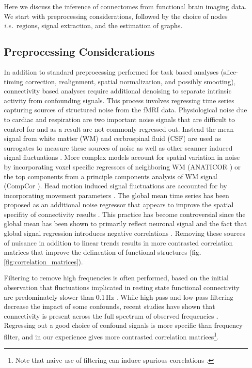 \documentclass[5p]{elsarticle}
\begin{document}
Here we discuss the inference of connectomes from functional brain
imaging data. We start with preprocessing considerations, followed by
the choice of nodes \emph{i.e.}\ regions,
signal extraction, and the estimation of graphs.  

\subsection{Preprocessing Considerations}

In addition to standard preprocessing performed for task based analyses
(slice-timing correction, realignment, spatial normalization, and possibly
smooting), connectivity based analyses require additional denoising 
to separate intrinsic activity from confounding signals. This process involves
regressing time series capturing sources of structured noise from the fMRI data.
Physiological noise due to cardiac and respiration are two important
noise signals \cite{Hu1993, lund2006, birn2006, birn2008} that are
difficult to control for and as a result are not commonly regressed out. Instead
the mean signal from white matter (WM) and cerbrospinal fluid (CSF) are used as
surrogates to measure these sources of noise as well as other scanner induced
signal fluctuations \cite{fox2005, lund2006}. More complex models account for
spatial variation in noise by incorporating voxel specific regressors of
neighboring WM (ANATICOR \cite{jo2010}) or the top components from a principle
components analysis of WM signal (CompCor \cite{behzadi2007}). Head motion
induced signal fluctuations are accounted for by incorporating movement
parameters \cite{friston1996, fox2005, lund2006}. The global mean time series
has been proposed as an additional noise regressor that appears to improve the
spatial specifity of connectivity results \cite{fox2005, fox2009}. This practice
has become controversial since the global mean has been shown to primarily reflect neuronal
signal and the fact that global signal regression introduces negative correlations
\cite{murphy2009,chang2009,saad2012}. 
Removing these sources of
nuisance in addition to linear trends results in more contrasted
correlation matrices that improve the delineation of functional structures
(fig.\,\ref{fig:correlation_matrices}). 

Filtering to remove high frequencies is often performed, based on the initial
observation that fluctuations implicated in resting state functional
connectivity are predominately slower than 0.1\,Hz \cite{cordes2001,biswal1995}.
While high-pass and low-pass filtering decrease the impact of some confounds,
recent studies have shown that connectivity is present across the
full spectrum of observed frequencies \cite{smith2012,vanoort2012}. Regressing
out a good choice of confound signals is more specific than frequency filter,
and in our experience gives more contrasted correlation matrices\footnote{Note
	that naive use of filtering can induce spurious correlations
	\cite{davey2012}.}.
\end{document}
